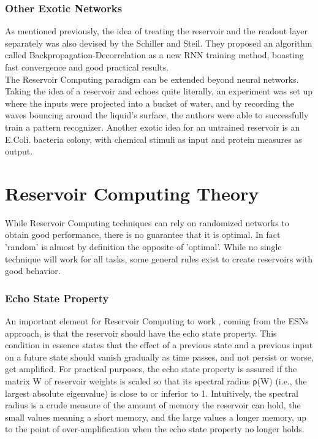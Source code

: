 \documentclass[12pt,oneside]{CUNY_CS_PhD}
\begin{document}
\subsubsection{Other Exotic Networks}
As mentioned previously, the idea of treating the reservoir and the readout layer separately was also devised by the Schiller and Steil. They proposed an algorithm called Backpropagation-Decorrelation as a new RNN training method, boasting fast convergence and good practical results. \\
The Reservoir Computing paradigm can be extended beyond neural networks. Taking the idea of a reservoir and echoes quite literally, an experiment was set up where the inputs were projected into a bucket of water, and by recording the waves bouncing around the liquid's surface, the authors were able to successfully train a pattern recognizer. Another exotic idea for an untrained reservoir is an E.Coli. bacteria colony, with chemical stimuli as input and protein measures as output.

\section{Reservoir Computing Theory}
While Reservoir Computing techniques can rely on randomized networks to obtain good performance, there is no guarantee that it is optimal. In fact 'random' is almost by definition the opposite of 'optimal'. While no single technique will work for all tasks, some general rules exist to create reservoirs with good behavior.

\subsubsection{Echo State Property}
An important element for Reservoir Computing to work , coming from the ESNs approach, is that the reservoir should have the echo state property. This condition in essence states that the effect of a previous state and a previous input on a future state should vanish gradually as time passes, and not persist or worse, get amplified. For practical purposes, the echo state property is assured if the matrix W of reservoir weights is scaled so that its spectral radius ρ(W) (i.e., the largest absolute eigenvalue) is close to or inferior to 1. Intuitively, the spectral radius is a crude measure of the amount of memory the reservoir can hold, the small values meaning a short memory, and the large values a longer memory, up to the point of over-amplification when the echo state property no longer holds.
\end{document}
